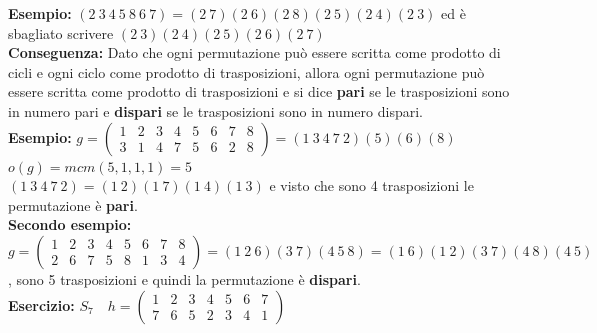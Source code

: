 \documentclass[12pt, letterpaper]{report}
\begin{document}
 		\textbf{Esempio:} $(2\ 3\ 4\ 5\ 8\ 6\ 7) = (2\ 7)(2\ 6)(2\ 8)(2\ 5)(2\ 4)(2\ 3)$ ed è sbagliato scrivere $(2\ 3)(2\ 4)(2\ 5)(2\ 6)(2\ 7)$ \\
 		\textbf{Conseguenza:} Dato che ogni permutazione può essere scritta come prodotto di cicli e ogni ciclo come prodotto di trasposizioni, allora ogni permutazione può essere scritta come prodotto di trasposizioni e si dice \textbf{pari} se le trasposizioni sono in numero pari e \textbf{dispari} se le trasposizioni sono in numero dispari. \\
 		\textbf{Esempio:} $g =\begin{pmatrix}
 			1 & 2 & 3 & 4 & 5 & 6 & 7 & 8 \\
 			3 & 1 & 4 & 7 & 5 & 6 & 2 & 8
 		\end{pmatrix} = (1\ 3\ 4\ 7\ 2)(5)(6)(8)$ \\
 		$o(g)= mcm(5,1,1,1) = 5$ \\
 		$(1\ 3\ 4\ 7\ 2) = (1\ 2)(1\ 7)(1\ 4)(1\ 3)$ e visto che sono 4 trasposizioni le permutazione è \textbf{pari}. \\
 		\textbf{Secondo esempio:} $g = \begin{pmatrix}
 			1 & 2 & 3 & 4 & 5 & 6 & 7 & 8 \\
 			2 & 6 & 7 & 5 & 8 & 1 & 3 & 4
 		\end{pmatrix} = (1\ 2\ 6)(3\ 7)(4\ 5\ 8) = (1\ 6)(1\ 2)(3\ 7)(4\ 8)(4\ 5)$, sono 5 trasposizioni e quindi la permutazione è \textbf{dispari}. \\
 		\textbf{Esercizio:} $S_7 \quad h = \begin{pmatrix}
 			1 & 2 & 3 & 4 & 5 & 6 & 7 \\
 			7 & 6 & 5 & 2 & 3 & 4 & 1
 		\end{pmatrix}$
\end{document}
